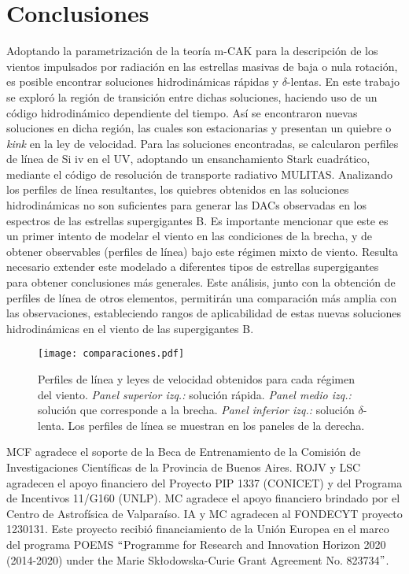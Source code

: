 \documentclass[baaa]{baaa}
\begin{document}
\section{Conclusiones}\label{conclusiones}
Adoptando la parametrizaci\'on de la teor\'ia m-CAK para la descripci\'on de los vientos impulsados por radiaci\'on en las estrellas masivas de baja o nula rotaci\'on, es posible encontrar soluciones hidrodin\'amicas r\'apidas y $\delta$-lentas. En este trabajo se explor\'o la regi\'on de transici\'on entre dichas soluciones, haciendo uso de un c\'odigo hidrodin\'amico dependiente del tiempo. As\'i se encontraron nuevas soluciones en dicha regi\'on, las cuales son estacionarias y presentan un quiebre o \textit{kink} en la ley de velocidad. Para las soluciones encontradas, se calcularon perfiles de l\'inea de Si {\sc iv} en el UV, adoptando un ensanchamiento Stark cuadr\'atico, mediante el c\'odigo de resoluci\'on de transporte radiativo MULITAS. Analizando los perfiles de l\'inea resultantes, los quiebres obtenidos en las soluciones hidrodin\'amicas no son suficientes para generar las DACs observadas en los espectros de las estrellas supergigantes B. Es importante mencionar que este es un primer intento de modelar el viento en las condiciones de la brecha, y de obtener observables (perfiles de l\'inea) bajo este r\'egimen mixto de viento. Resulta necesario extender este modelado a diferentes tipos de estrellas supergigantes para obtener conclusiones más generales. Este an\'alisis, junto con la obtención de perfiles de línea de otros elementos, permitirán una comparación más amplia con las observaciones, estableciendo rangos de aplicabilidad de estas nuevas soluciones hidrodinámicas en el viento de las supergigantes B.
\begin{figure}[!t]
\centering
\texttt{[image: comparaciones.pdf]}
\caption{Perfiles de l\'inea y leyes de velocidad obtenidos para cada r\'egimen del viento. \emph{Panel superior izq.:} soluci\'on r\'apida. \emph{Panel medio izq.:} soluci\'on que corresponde a la brecha. \emph{Panel inferior izq.:} soluci\'on $\delta$-lenta. Los perfiles de l\'inea se muestran en los paneles de la derecha.}
\label{perfiles}
\end{figure}


\begin{acknowledgement}
  MCF agradece el soporte de la Beca de Entrenamiento de la Comisi\'on de Investigaciones Cient\'ificas de la Provincia de Buenos Aires. 
ROJV y LSC agradecen el apoyo financiero del Proyecto PIP 1337 (CONICET) y del Programa de Incentivos 11/G160 (UNLP). MC agradece el apoyo financiero brindado por el Centro de Astrofísica de Valparaíso. IA y MC agradecen al FONDECYT proyecto 1230131. %
Este proyecto recibió financiamiento de la Unión Europea en el marco del programa POEMS $``$Programme for Research and Innovation Horizon 2020 (2014-2020) under the Marie Sk\l{}odowska-Curie Grant Agreement No. 823734$"$.
\end{acknowledgement}
\end{document}
